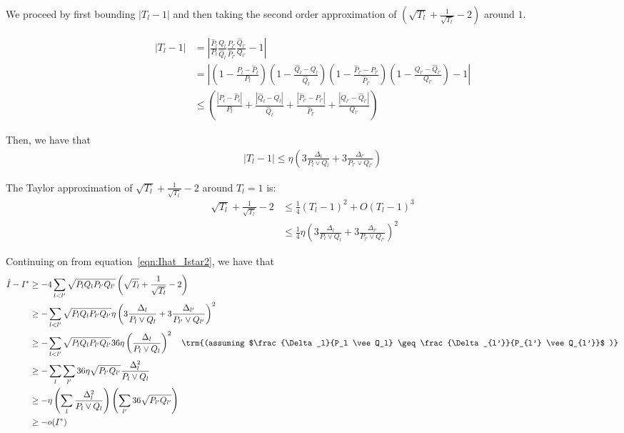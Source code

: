 \documentclass{article}
\begin{document}
We proceed by first bounding $|T_l - 1|$ and then taking the second order approximation of $\left( \sqrt{T_l} + \frac{1}{\sqrt{T_l}} - 2 \right)$ around $1$. 

\begin{align*}
|T_l - 1| &= \left| \frac{\hat{P}_l}{P_l} \frac{Q_l}{\hat{Q}_l} 
      \frac{P_{l'}}{\hat{P}_{l'}} \frac{\hat{Q}_{l'}}{Q_{l'}} - 1 \right| \\
 &= \left| \left( 1 - \frac{P_l - \hat{P}_l}{P_l} \right)
    \left( 1 - \frac{\hat{Q}_l - Q_l}{\hat{Q}_l} \right)
   \left( 1- \frac{\hat{P}_{l'} - P_{l'}}{\hat{P}_{l'}}\right)
   \left( 1 -  \frac{Q_{l'}- \hat{Q}_{l'}}{Q_{l'}} \right) -1 \right| \\
&\leq \left( \frac{|P_l - \hat{P}_l|}{P_l} +  \frac{|\hat{Q}_l - Q_l|}{\hat{Q}_l}
           +   \frac{| \hat{P}_{l'} - P_{l'}|}{\hat{P}_{l'}} +
               \frac{| Q_{l'} - \hat{Q}_{l'} | }{Q_{l'}} \right) 
\end{align*}


Then, we have that
\begin{align*}
|T_l - 1| \leq \eta \left( 3 \frac{\Delta_l}{P_l \vee Q_l} + 3 \frac{\Delta_{l'}}{P_{l'} \vee Q_{l'}} \right) 
\end{align*}

The Taylor approximation of $\sqrt{T_l} + \frac{1}{\sqrt{T_l}} - 2$ around $T_l=1$ is:
\begin{align*}
\sqrt{T_l} + \frac{1}{\sqrt{T_l}} -2  &\leq 
  \frac{1}{4} (T_l - 1)^2 + O (T_l-1)^3 \\
 &\leq \frac{1}{4} \eta \left( 3 \frac{\Delta_l}{P_l \vee Q_l} + 3 \frac{\Delta_{l'}}{P_{l'} \vee Q_{l'}} \right)^2 
\end{align*}

Continuing on from equation~\ref{eqn:Ihat_Istar2}, we have that
\begin{align*}
\hat{I} - I^* &\geq - 4 \sum_{l < l'} \sqrt{P_l Q_l P_{l'} Q_{l'}} 
    \left( \sqrt{T_l} + \frac{1}{\sqrt{T_l}} - 2 \right) \\
  &\geq - \sum_{l < l'} \sqrt{P_l Q_l P_{l'} Q_{l'}} 
    \eta \left( 3 \frac{\Delta_l}{P_l \vee Q_l} + 3 \frac{\Delta_{l'} }{P_{l'} \vee Q_{l'}} 
     \right)^2 \\
 &\geq - \sum_{l < l'} \sqrt{P_l Q_l P_{l'} Q_{l'}} 
           36 \eta \left( \frac{\Delta_l}{ P_l \vee Q_l} \right)^2 
    \quad \trm{(assuming $\frac{\Delta_l}{P_l \vee Q_l} \geq 
                 \frac{\Delta_{l'}}{P_{l'} \vee Q_{l'}}$ )} \\
 &\geq - \sum_l \sum_{l'} 36 \eta \sqrt{P_{l'}Q_{l'}} \frac{\Delta_l^2}{P_l \vee Q_l} \\
 &\geq - \eta \left( \sum_l \frac{\Delta_l^2}{P_l \vee Q_l} \right)
         \left( \sum_{l'} 36 \sqrt{P_{l'}Q_{l'}} \right) \\
 &\geq - o(I^*)
\end{align*}
\end{document}
